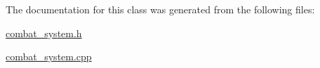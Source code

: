 The documentation for this class was generated from the following files\-:\begin{DoxyCompactItemize}
\item 
\hyperlink{combat__system_8h}{combat\-\_\-system.\-h}\item 
\hyperlink{combat__system_8cpp}{combat\-\_\-system.\-cpp}\end{DoxyCompactItemize}
